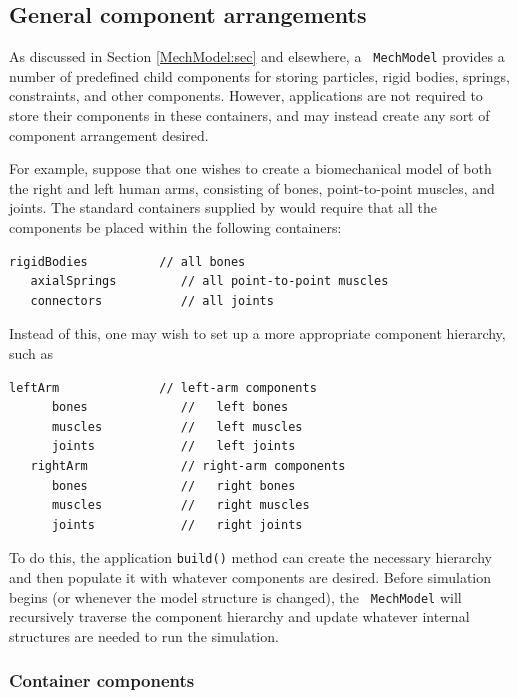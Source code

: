 \subsection{General component arrangements}

As discussed in Section \ref{MechModel:sec} and elsewhere, a {\tt
MechModel} provides a number of predefined child components for
storing particles, rigid bodies, springs, constraints, and other
components.  However, applications are not required to store their
components in these containers, and may instead create any sort of
component arrangement desired.

For example, suppose that one wishes to create a biomechanical model
of both the right and left human arms, consisting of bones,
point-to-point muscles, and joints. The standard containers supplied
by  would require that
all the components be placed within the following containers:
%
\begin{lstlisting}[]
   rigidBodies          // all bones
   axialSprings         // all point-to-point muscles
   connectors           // all joints
\end{lstlisting}
%
Instead of this, one may wish to set up a more appropriate component
hierarchy, such as
%
\begin{lstlisting}[]
   leftArm              // left-arm components
      bones             //   left bones
      muscles           //   left muscles
      joints            //   left joints
   rightArm             // right-arm components
      bones             //   right bones
      muscles           //   right muscles
      joints            //   right joints
\end{lstlisting}
%
To do this, the application {\tt build()} method can create the
necessary hierarchy and then
populate it with whatever components are desired.  Before simulation
begins (or whenever the model structure is changed), the {\tt
MechModel} will recursively traverse the component hierarchy and
update whatever internal structures are needed to run the
simulation.

\subsubsection{Container components}


